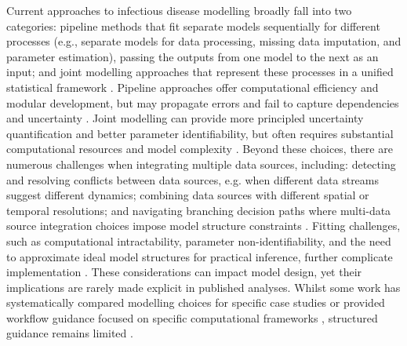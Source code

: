 \documentclass{article}
\begin{document}
Current approaches to infectious disease modelling broadly fall into two categories: pipeline methods that fit separate models sequentially for different processes (e.g., separate models for data processing, missing data imputation, and parameter estimation), passing the outputs from one model to the next as an input; and joint modelling approaches that represent these processes in a unified statistical framework \citep{deangelis2018analysing}.
Pipeline approaches offer computational efficiency and modular development, but may propagate errors and fail to capture dependencies and uncertainty \citep{lison2024generative, Ward2024-sp}.
Joint modelling can provide more principled uncertainty quantification and better parameter identifiability, but often requires substantial computational resources and model complexity \citep{russell2024combined, lison2024generative}.
Beyond these choices, there are numerous challenges when integrating multiple data sources, including: detecting and resolving conflicts between data sources, e.g. when different data streams suggest different dynamics; combining data sources with different spatial or temporal resolutions; and navigating branching decision paths where multi-data source integration choices impose model structure constraints \citep{deangelis2018analysing, nicholson2022interoperability}.
Fitting challenges, such as computational intractability, parameter non-identifiability, and the need to approximate ideal model structures for practical inference, further complicate implementation \citep{corbella2022inferring, Ward2024-sp}.
These considerations can impact model design, yet their implications are rarely made explicit in published analyses.
Whilst some work has systematically compared modelling choices for specific case studies \citep{bouman2024bayesian} or provided workflow guidance focused on specific computational frameworks \citep{grinsztajn2021bayesian}, structured guidance remains limited \citep{Behrend2020-au, nicholson2022interoperability, deangelis2018analysing}.
\end{document}
